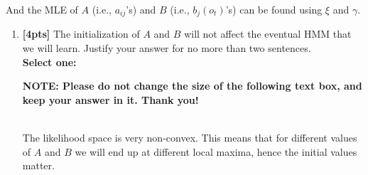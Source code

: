 \begin{enumerate}
    And the MLE of $A$ (i.e., $a_{ij}$'s) and $B$ (i.e., $b_j(o_t)$'s) can be found using $\xi$ and $\gamma$. 
    
    
   \begin{enumerate}
         \item \textbf{[4pts]} The initialization of $A$ and $B$ will not affect the eventual HMM that we will learn. Justify your answer for no more than two sentences.\\
        \textbf{Select one:}
        \textbf{NOTE: Please do not change the size of the following text box, and keep your answer in it. Thank you!} \\ \\
        \begin{tcolorbox}[fit,height=4cm, width=15cm, blank, borderline={1pt}{-2pt},nobeforeafter]
        \large
        The likelihood space is very non-convex. This means that for different values of $A$ and $B$ we will end up at different local maxima, hence the initial values matter.
    

\end{tcolorbox}
\end{enumerate}
\end{enumerate}
